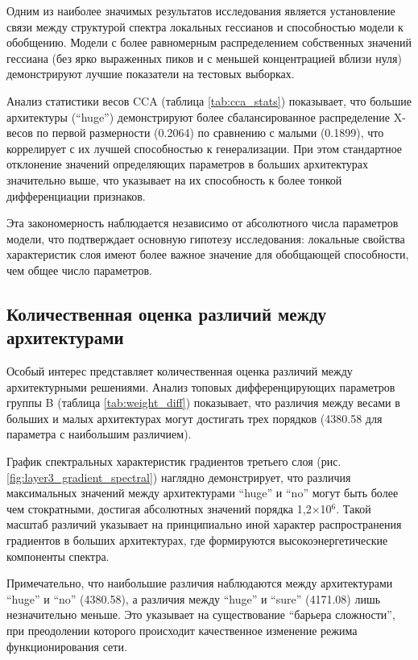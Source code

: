 \documentclass[a4paper,12pt]{article}
\begin{document}
Одним из наиболее значимых результатов исследования является установление связи между структурой спектра
локальных гессианов и способностью модели к обобщению. Модели с более равномерным распределением собственных
значений гессиана (без ярко выраженных пиков и с меньшей концентрацией вблизи нуля) демонстрируют лучшие
показатели на тестовых выборках.

Анализ статистики весов CCA (таблица \ref{tab:cca_stats}) показывает, что большие архитектуры (``huge'')
демонстрируют более сбалансированное распределение X-весов по первой размерности (0.2064) по сравнению с
малыми (0.1899), что коррелирует с их лучшей способностью к генерализации. При этом стандартное отклонение
значений определяющих параметров в больших архитектурах значительно выше, что указывает на их способность к
более тонкой дифференциации признаков.

Эта закономерность наблюдается независимо от абсолютного числа параметров модели, что подтверждает основную
гипотезу исследования: локальные свойства характеристик слоя имеют более важное значение для
обобщающей способности, чем общее число параметров.

\subsection{Количественная оценка различий между архитектурами}

Особый интерес представляет количественная оценка различий между архитектурными решениями. Анализ топовых
дифференцирующих параметров группы B (таблица \ref{tab:weight_diff}) показывает, что различия между весами в
больших и малых архитектурах могут достигать трех порядков (4380.58 для параметра с наибольшим различием).

График спектральных характеристик градиентов третьего слоя (рис. \ref{fig:layer3_gradient_spectral}) наглядно
демонстрирует, что различия максимальных значений между архитектурами ``huge'' и ``no'' могут быть более чем
стократными, достигая абсолютных значений порядка 1,2$\times$10$^6$. Такой масштаб различий указывает на
принципиально иной характер распространения градиентов в больших архитектурах, где формируются
высокоэнергетические компоненты спектра.

Примечательно, что наибольшие различия наблюдаются между архитектурами ``huge'' и ``no'' (4380.58), а
различия между ``huge'' и ``sure'' (4171.08) лишь незначительно меньше. Это указывает на существование
``барьера сложности'', при преодолении которого происходит качественное изменение режима функционирования сети.
\end{document}
